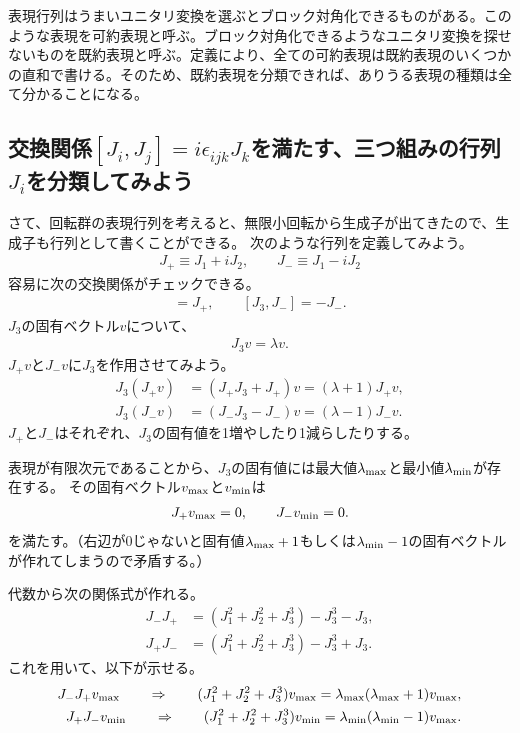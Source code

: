 \documentclass[10pt,a4paper]{jarticle}
\begin{document}
表現行列はうまいユニタリ変換を選ぶとブロック対角化できるものがある。このような表現を可約表現と呼ぶ。ブロック対角化できるようなユニタリ変換を探せないものを既約表現と呼ぶ。定義により、全ての可約表現は既約表現のいくつかの直和で書ける。そのため、既約表現を分類できれば、ありうる表現の種類は全て分かることになる。

\subsection{交換関係$[J_i, J_j] = i\epsilon_{ijk} J_k$を満たす、三つ組みの行列$J_i$を分類してみよう}
さて、回転群の表現行列を考えると、無限小回転から生成子が出てきたので、生成子も行列として書くことができる。
次のような行列を定義してみよう。
\begin{align}
J_+ \equiv J_1 + i J_2, \qquad
J_- \equiv J_1 - i J_2
\end{align}
容易に次の交換関係がチェックできる。
\begin{align}
[J_3, J_+] = J_+, \qquad
[J_3, J_-] = -J_-.
\end{align}
$J_3$の固有ベクトル$v$について、
\begin{align}
J_3 v = \lambda v.
\end{align}
%
$J_+ v$と$J_- v$に$J_3$を作用させてみよう。
\begin{align}
J_3 (J_+ v) &= ( J_+ J_3 + J_+ )v = (\lambda + 1) J_+ v, \\
J_3 (J_- v) &= ( J_- J_3 - J_- )v = (\lambda - 1) J_- v.
\end{align}
$J_+$と$J_-$はそれぞれ、$J_3$の固有値を1増やしたり1減らしたりする。

表現が有限次元であることから、$J_3$の固有値には最大値$\lambda_{\rm max}$と最小値$\lambda_{\rm min}$が存在する。
その固有ベクトル$v_{\rm max}$と$v_{\rm min}$は
\begin{align}
J_+ v_{\rm max} = 0, \qquad
J_- v_{\rm min} = 0.
\end{align}
を満たす。（右辺が0じゃないと固有値$\lambda_{\rm max}+1$もしくは$\lambda_{\rm min}-1$の固有ベクトルが作れてしまうので矛盾する。）

代数から次の関係式が作れる。
\begin{align}
J_- J_+ &= (J_1^2 + J_2^2 + J_3^3) - J_3^3 - J_3, \\
J_+ J_- &= (J_1^2 + J_2^2 + J_3^3) - J_3^3 + J_3.
\end{align}
これを用いて、以下が示せる。
\begin{align}
J_- J_+ v_{\rm max} \qquad \Rightarrow \qquad (J_1^2 + J_2^2 + J_3^3) v_{\rm max} = \lambda_{\rm max} (\lambda_{\rm max}+1) v_{\rm max}, \\
J_+ J_- v_{\rm min} \qquad \Rightarrow \qquad (J_1^2 + J_2^2 + J_3^3) v_{\rm min} = \lambda_{\rm min} (\lambda_{\rm min}-1) v_{\rm max}.
\end{align}
\end{document}
